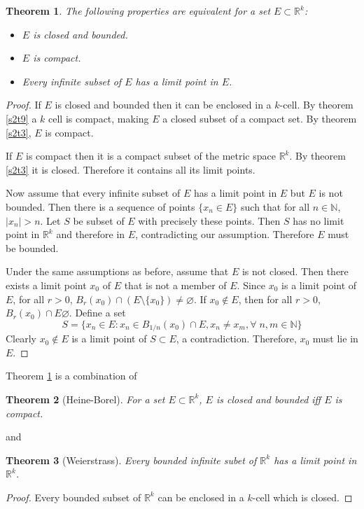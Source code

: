\documentclass{article}
\theoremstyle{plain}
\newtheorem{thm}{Theorem}
\numberwithin{thm}{section}
\theoremstyle{plain}
\numberwithin{prop}{section}
\theoremstyle{definition}
\numberwithin{defn}{section}
\theoremstyle{remark}
\numberwithin{equation}{section}
\begin{document}
\begin{thm}\label{s2t10}
The following properties are equivalent for a set $E \subset \mathbb{R}^k$:
\begin{itemize}
\item $E$ is closed and bounded.
\item $E$ is compact.
\item Every infinite subset of $E$ has a limit point in $E$.
\end{itemize}
\end{thm}
\begin{proof}
If $E$ is closed and bounded then it can be enclosed in a $k$-cell. By theorem
\ref{s2t9} a $k$ cell is compact, making $E$ a closed subset of a compact set.
By theorem \ref{s2t3}, $E$ is compact.

If $E$ is compact then it is a compact subset of the metric space $\mathbb{R}^k$.
By theorem \ref{s2t3} it is closed. Therefore it contains all its limit points.

Now assume that every infinite subset of $E$ has a limit point in $E$ but $E$
is not bounded. Then there is a sequence of points $\{x_n \in E\}$ such that
for all $n \in \mathbb{N}$, $|x_n| > n$. Let $S$ be subset of $E$ with precisely
these points. Then $S$ has no limit point in $\mathbb{R}^k$ and therefore in 
$E$, contradicting our assumption. Therefore $E$ must be bounded.

Under the same assumptions as before, assume that $E$ is not closed. Then
there exists a limit point $x_0$ of $E$ that is not a member of $E$. Since 
$x_0$ is a limit point of $E$, for all $r > 0$, $B_r(x_0) \cap (E \setminus \{
x_0\}) \ne \varnothing$. If $x_0 \notin E$, then for all $r > 0$, $B_r(x_0) \cap
E \varnothing$. Define a set
\[
S = \{x_n \in E : x_n \in B_{1/n}(x_0) \cap E, x_n \ne x_m, \forall\; n, m \in
\mathbb{N}\}
\]
Clearly $x_0 \notin E$ is a limit point of $S \subset E$, a contradiction.
Therefore, $x_0$ must lie in $E$.
\end{proof}

Theorem \ref{s2t10} is a combination of
\begin{thm}[Heine-Borel]\label{s2t11}
For a set $E \subset \mathbb{R}^k$, $E$ is closed and bounded iff $E$ is compact.
\end{thm}
and
\begin{thm}[Weierstrass]\label{s2t12}
Every bounded infinite subet of $\mathbb{R}^k$ has a limit point in 
$\mathbb{R}^k$.
\end{thm}
\begin{proof}
Every bounded subset of $\mathbb{R}^k$ can be enclosed in a $k$-cell which is
closed.
\end{proof}
\end{document}

